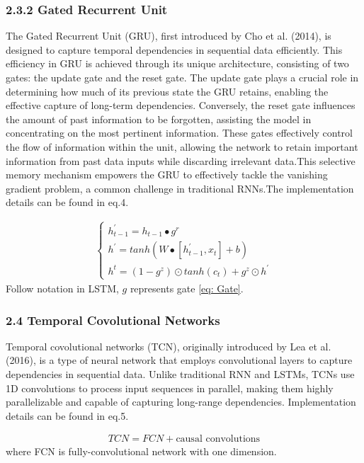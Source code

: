\documentclass[10pt,letterpaper]{article}
\begin{document}
\subsubsection*{2.3.2 Gated Recurrent Unit}
 The Gated Recurrent Unit (GRU), first introduced by Cho et al. (2014), is designed to capture temporal dependencies in sequential data efficiently. This efficiency in GRU is achieved through its unique architecture, consisting of two gates: the update gate and the reset gate. The update gate plays a crucial role in determining how much of its previous state the GRU retains, enabling the effective capture of long-term dependencies. Conversely, the reset gate influences the amount of past information to be forgotten, assisting the model in concentrating on the most pertinent information. These gates effectively control the flow of information within the unit, allowing the network to retain important information from past data inputs while discarding irrelevant data.This selective memory mechanism empowers the GRU to effectively tackle the vanishing gradient problem, a common challenge in traditional RNNs.The implementation details can be found in eq.4.

\begin{eqnarray}
\label{eq: GRU}
    \begin {cases} h^{'}_{t - 1} = h_{t - 1}{\bullet}g^r
    \\h^{'} = tanh(W\bullet[h^{'}_{t - 1}, x_t] + b)
    \\h^t = (1 - g^z){\odot}tanh(c_t) + g^z{\odot}h^{'}
    \end {cases}
\end{eqnarray}
Follow notation in LSTM,  $g$ represents gate \ref{eq: Gate}.



\subsubsection*{2.4 Temporal Covolutional Networks}
Temporal covolutional networks (TCN), originally introduced by Lea et al. (2016), is a type of neural network that employs convolutional layers to capture dependencies in sequential data. Unlike traditional RNN and LSTMs, TCNs use 1D convolutions to process input sequences in parallel, making them highly parallelizable and capable of capturing long-range dependencies. Implementation details can be found in eq.5.

\begin{eqnarray}
\label{eq: TCN}
    TCN = FCN + \text{causal convolutions}
\end{eqnarray}
where FCN is fully-convolutional network with one dimension.
\end{document}
